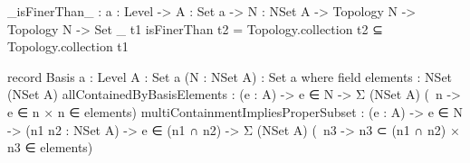 \begin{code}
_isFinerThan_ : {a : Level} ->
                {A : Set a} ->
                {N : NSet A} ->
                Topology N ->
                Topology N ->
                Set _
t1 isFinerThan t2 = Topology.collection t2 ⊆ Topology.collection t1

record Basis {a : Level}
             {A : Set a}
             (N : NSet A) : Set a where
  field
   elements : NSet (NSet A)
   allContainedByBasisElements :
     (e : A) ->
     e ∈ N ->
     Σ (NSet A) (\ n -> e ∈ n × n ∈ elements)
   multiContainmentImpliesProperSubset :
     (e : A) ->
     e ∈ N ->
     (n1 n2 : NSet A) ->
     e ∈ (n1 ∩ n2) ->
     Σ (NSet A) (\ n3 -> n3 ⊂ (n1 ∩ n2) × n3 ∈ elements)
\end{code}
